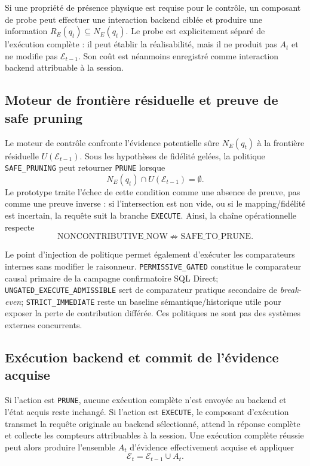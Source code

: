 \documentclass[journal]{IEEEtran}
\begin{document}
Si une propriété de présence physique est requise pour le contrôle, un composant de probe peut effectuer une interaction backend ciblée et produire une information $R_E(q_t)\subseteq N_E(q_t)$. Le probe est explicitement séparé de l'exécution complète : il peut établir la réalisabilité, mais il ne produit pas $A_t$ et ne modifie pas $\mathcal{E}_{t-1}$. Son coût est néanmoins enregistré comme interaction backend attribuable à la session.

\subsection{Moteur de frontière résiduelle et preuve de safe pruning}

Le moteur de contrôle confronte l'évidence potentielle sûre $N_E(q_t)$ à la frontière résiduelle $U(\mathcal{E}_{t-1})$. Sous les hypothèses de fidélité gelées, la politique \texttt{SAFE\_PRUNING} peut retourner \texttt{PRUNE} lorsque
\[
N_E(q_t)\cap U(\mathcal{E}_{t-1})=\emptyset.
\]
Le prototype traite l'échec de cette condition comme une absence de preuve, pas comme une preuve inverse : si l'intersection est non vide, ou si le mapping/fidélité est incertain, la requête suit la branche \texttt{EXECUTE}. Ainsi, la chaîne opérationnelle respecte
\[
\text{NONCONTRIBUTIVE\_NOW}\not\Rightarrow\text{SAFE\_TO\_PRUNE}.
\]

Le point d'injection de politique permet également d'exécuter les comparateurs internes sans modifier le raisonneur. \texttt{PERMISSIVE\_GATED} constitue le comparateur causal primaire de la campagne confirmatoire SQL Direct; \texttt{UNGATED\_EXECUTE\_ADMISSIBLE} sert de comparateur pratique secondaire de \emph{break-even}; \texttt{STRICT\_IMMEDIATE} reste un baseline sémantique/historique utile pour exposer la perte de contribution différée. Ces politiques ne sont pas des systèmes externes concurrents.

\subsection{Exécution backend et commit de l'évidence acquise}

Si l'action est \texttt{PRUNE}, aucune exécution complète n'est envoyée au backend et l'état acquis reste inchangé. Si l'action est \texttt{EXECUTE}, le composant d'exécution transmet la requête originale au backend sélectionné, attend la réponse complète et collecte les compteurs attribuables à la session. Une exécution complète réussie peut alors produire l'ensemble $A_t$ d'évidence effectivement acquise et appliquer
\[
\mathcal{E}_t=\mathcal{E}_{t-1}\cup A_t.
\]
\end{document}
